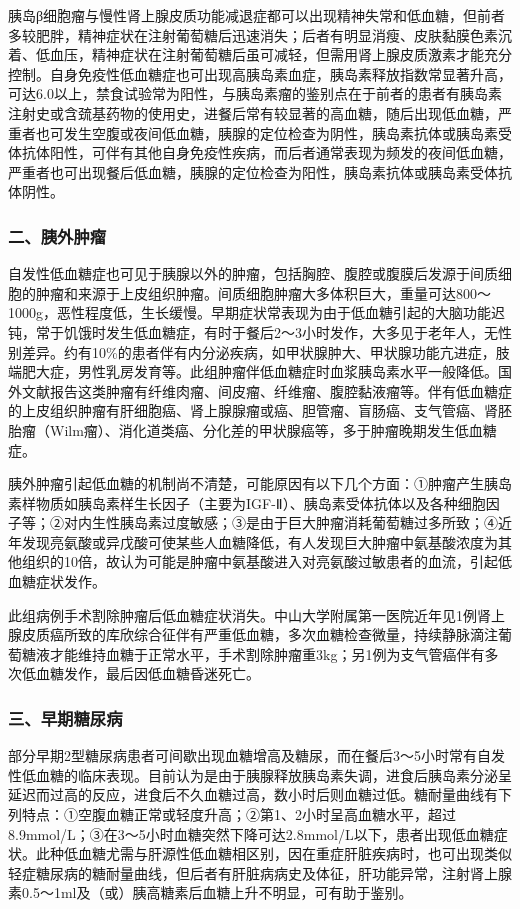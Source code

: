 胰岛β细胞瘤与慢性肾上腺皮质功能减退症都可以出现精神失常和低血糖，但前者多较肥胖，精神症状在注射葡萄糖后迅速消失；后者有明显消瘦、皮肤黏膜色素沉着、低血压，精神症状在注射葡萄糖后虽可减轻，但需用肾上腺皮质激素才能充分控制。自身免疫性低血糖症也可出现高胰岛素血症，胰岛素释放指数常显著升高，可达6.0以上，禁食试验常为阳性，与胰岛素瘤的鉴别点在于前者的患者有胰岛素注射史或含巯基药物的使用史，进餐后常有较显著的高血糖，随后出现低血糖，严重者也可发生空腹或夜间低血糖，胰腺的定位检查为阴性，胰岛素抗体或胰岛素受体抗体阳性，可伴有其他自身免疫性疾病，而后者通常表现为频发的夜间低血糖，严重者也可出现餐后低血糖，胰腺的定位检查为阳性，胰岛素抗体或胰岛素受体抗体阴性。

\subsubsection{二、胰外肿瘤}

自发性低血糖症也可见于胰腺以外的肿瘤，包括胸腔、腹腔或腹膜后发源于间质细胞的肿瘤和来源于上皮组织肿瘤。间质细胞肿瘤大多体积巨大，重量可达800～1000g，恶性程度低，生长缓慢。早期症状常表现为由于低血糖引起的大脑功能迟钝，常于饥饿时发生低血糖症，有时于餐后2～3小时发作，大多见于老年人，无性别差异。约有10\%的患者伴有内分泌疾病，如甲状腺肿大、甲状腺功能亢进症，肢端肥大症，男性乳房发育等。此组肿瘤伴低血糖症时血浆胰岛素水平一般降低。国外文献报告这类肿瘤有纤维肉瘤、间皮瘤、纤维瘤、腹腔黏液瘤等。伴有低血糖症的上皮组织肿瘤有肝细胞癌、肾上腺腺瘤或癌、胆管瘤、盲肠癌、支气管癌、肾胚胎瘤（Wilm瘤）、消化道类癌、分化差的甲状腺癌等，多于肿瘤晚期发生低血糖症。

胰外肿瘤引起低血糖的机制尚不清楚，可能原因有以下几个方面：①肿瘤产生胰岛素样物质如胰岛素样生长因子（主要为IGF-Ⅱ）、胰岛素受体抗体以及各种细胞因子等；②对内生性胰岛素过度敏感；③是由于巨大肿瘤消耗葡萄糖过多所致；④近年发现亮氨酸或异戊酸可使某些人血糖降低，有人发现巨大肿瘤中氨基酸浓度为其他组织的10倍，故认为可能是肿瘤中氨基酸进入对亮氨酸过敏患者的血流，引起低血糖症状发作。

此组病例手术割除肿瘤后低血糖症状消失。中山大学附属第一医院近年见1例肾上腺皮质癌所致的库欣综合征伴有严重低血糖，多次血糖检查微量，持续静脉滴注葡萄糖液才能维持血糖于正常水平，手术割除肿瘤重3kg；另1例为支气管癌伴有多次低血糖发作，最后因低血糖昏迷死亡。

\subsubsection{三、早期糖尿病}

部分早期2型糖尿病患者可间歇出现血糖增高及糖尿，而在餐后3～5小时常有自发性低血糖的临床表现。目前认为是由于胰腺释放胰岛素失调，进食后胰岛素分泌呈延迟而过高的反应，进食后不久血糖过高，数小时后则血糖过低。糖耐量曲线有下列特点：①空腹血糖正常或轻度升高；②第1、2小时呈高血糖水平，超过8.9mmol/L；③在3～5小时血糖突然下降可达2.8mmol/L以下，患者出现低血糖症状。此种低血糖尤需与肝源性低血糖相区别，因在重症肝脏疾病时，也可出现类似轻症糖尿病的糖耐量曲线，但后者有肝脏病病史及体征，肝功能异常，注射肾上腺素0.5～1ml及（或）胰高糖素后血糖上升不明显，可有助于鉴别。

